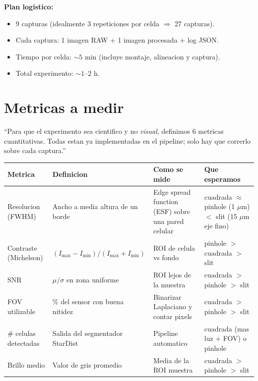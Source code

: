 \documentclass[11pt,a4paper,oneside]{report}
\begin{document}
\begin{accion}
\textbf{Plan logistico:}
\begin{itemize}[leftmargin=1.5em]
  \item 9 capturas (idealmente 3 repeticiones por celda $\Rightarrow$ 27 capturas).
  \item Cada captura: 1 imagen RAW $+$ 1 imagen procesada $+$ log JSON.
  \item Tiempo por celda: $\sim 5$ min (incluye montaje, alineacion y captura).
  \item Total experimento: $\sim 1$--2 h.
\end{itemize}
\end{accion}

\chapter{Metricas a medir}

\begin{decir}
``Para que el experimento sea cientifico y no \emph{visual}, definimos 6 metricas
cuantitativas. Todas estan ya implementadas en el pipeline; solo hay que correrlo
sobre cada captura.''
\end{decir}

\begin{center}
\renewcommand{\arraystretch}{1.5}
\small
\begin{tabular}{p{2.7cm}p{3.5cm}p{3.5cm}p{3.7cm}}
\toprule
\textbf{Metrica} & \textbf{Definicion} & \textbf{Como se mide} & \textbf{Que esperamos} \\
\midrule
Resolucion (FWHM) &
Ancho a media altura de un borde &
Edge spread function (ESF) sobre una pared celular &
cuadrada $\approx$ pinhole (1 $\mu$m) $<$ slit (15 $\mu$m eje fino) \\
Contraste (Michelson) &
$(I_{\max}{-}I_{\min}) / (I_{\max}{+}I_{\min})$ &
ROI de celula vs fondo &
pinhole $>$ cuadrada $>$ slit \\
SNR &
$\mu / \sigma$ en zona uniforme &
ROI lejos de la muestra &
cuadrada $>$ pinhole $>$ slit \\
FOV utilizable &
\% del sensor con buena nitidez &
Binarizar Laplaciano y contar pixels &
cuadrada $>$ pinhole $>$ slit \\
\# celulas detectadas &
Salida del segmentador StarDist &
Pipeline automatico &
cuadrada (mas luz $+$ FOV) o pinhole \\
Brillo medio &
Valor de gris promedio &
Media de la ROI muestra &
cuadrada $>$ pinhole $>$ slit \\
\bottomrule
\end{tabular}
\end{center}
\end{document}
